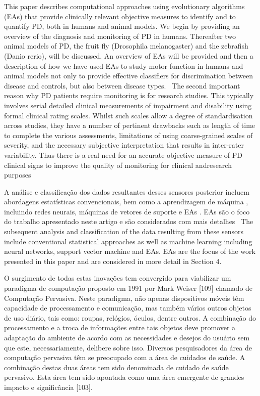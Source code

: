 This paper describes computational approaches using evolutionary algorithms (EAs) that provide clinically relevant objective measures to identify and to quantify PD, both in humans and animal models. We begin by providing an overview of the diagnosis and monitoring of PD in humans. Thereafter two animal models of PD, the fruit fly (Drosophila melanogaster) and the zebrafish (Danio rerio), will be discussed. An overview of EAs will be provided and then a description of how we have used EAs
to study motor function in humans and animal models not only to provide effective classifiers for discrimination between disease and controls, but also between disease types.~\cite{compapproachparkinson2015}
The second important reason why PD patients require monitoring is for research studies. This typically involves serial detailed clinical measurements of impairment and disability using formal clinical rating scales. Whilst such scales allow a degree of standardisation across studies, they have a number of pertinent drawbacks such as length of time to complete the various assessments, limitations of using coarse-grained scales of severity, and the necessary subjective interpretation that results in inter-rater variability. Thus there is a real need for an accurate objective measure of PD clinical signs to improve the quality of monitoring for clinical andresearch purposes~\cite{compapproachparkinson2015}

A análise e classificação dos dados resultantes desses sensores posterior incluem abordagens estatísticas convencionais, bem como a aprendizagem de máquina , incluindo redes neurais, máquinas de vetores de suporte e EAs . EAs são o foco do trabalho apresentado neste artigo e são considerados com mais detalhes~\cite{compapproachparkinson2015}
The subsequent analysis and classification of the data resulting from these sensors include conventional statistical approaches as well as machine learning including neural networks, support vector machine and EAs. EAs are the focus of the work presented in this paper and are considered in more detail in Section 4.~\cite{compapproachparkinson2015}


O surgimento de todas estas inovações tem convergido para viabilizar um paradigma de
computação proposto em 1991 por Mark Weiser [109] chamado de Computação Pervasiva.
Neste paradigma, não apenas dispositivos móveis têm capacidade de processamento e comunicação,
mas também vários outros objetos de uso diário, tais como: roupas, relógios, óculos,
dentre outros. A combinação do processamento e a troca de informações entre tais objetos
deve promover a adaptação do ambiente de acordo com as necessidades e desejos do usuário
sem que este, necessariamente, delibere sobre isso.
Diversos pesquisadores da área de computação pervasiva têm se preocupado com a área
de cuidados de saúde. A combinação destas duas áreas tem sido denominada de cuidado de
saúde pervasivo. Esta área tem sido apontada como uma área emergente de grandes impacto
e significância [103].










